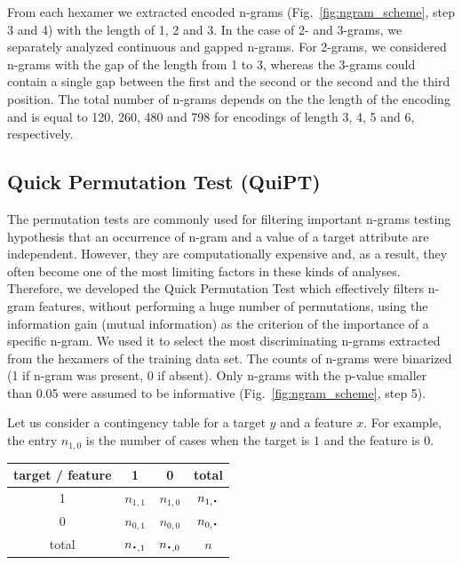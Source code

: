 \documentclass[fleqn,10pt,twoside]{gcb15submission}
\newcommand*{\bigcdot}{\raisebox{-0.25ex}{\scalebox{1.5}{$\cdot$}}}
\begin{document}
  From each hexamer we extracted encoded n-grams (Fig.~\ref{fig:ngram_scheme}, step 3 and 4) 
with the length of 1, 2 and 3. In the case of 2- and 3-grams, we 
separately analyzed continuous and gapped n-grams. For 2-grams, we considered 
n-grams with the gap of the length from 1 to 3, whereas the 3-grams could 
contain a single gap between the first and the second or the second and the 
third position. The total number of n-grams 
depends on the the length of the encoding and is equal to 120, 260, 480 and 798 
for encodings of length 3, 4, 5 and 6, respectively.


\subsection{Quick Permutation Test (QuiPT)}

The permutation tests are commonly used for filtering important n-grams 
testing hypothesis that an occurrence of n-gram and a value of a target attribute are 
independent. However, they are computationally expensive and, as a result, they 
often become one of the most limiting factors in these kinds of analyses. 
Therefore, we developed the Quick Permutation Test which effectively filters 
n-gram features, without performing a huge number of permutations, using the 
information gain (mutual information) as the criterion of the importance of a 
specific n-gram. We used it to select the most discriminating n-grams extracted 
from the hexamers of the training data set. The counts of n-grams were binarized 
(1 if n-gram was present, 0 if absent). Only n-grams with the p-value smaller 
than 0.05 were assumed to be informative (Fig.~\ref{fig:ngram_scheme}, step 5). 

  Let us consider a contingency table for a target $y$ and 
a feature $x$. For example, the entry $n_{1,0}$ is the number of cases when the 
target is $1$ and the feature is $0$.

\begin{center}
\small
\begin{tabular}{ | c || c | c | c | }
%
%
  \hline			
  target / feature & 1 & 0 & total\\ \hline
 1 & $n_{1,1}$ & $n_{1,0}$ & $n_{1,\bigcdot}$ \\
 0 & $n_{0,1}$ & $n_{0,0}$ & $n_{0,\bigcdot}$ \\ \hline
 total & $n_{\bigcdot,1}$ & $n_{\bigcdot,0}$ & $n$ \\
  \hline  
\end{tabular} 
\end{center}
\end{document}
